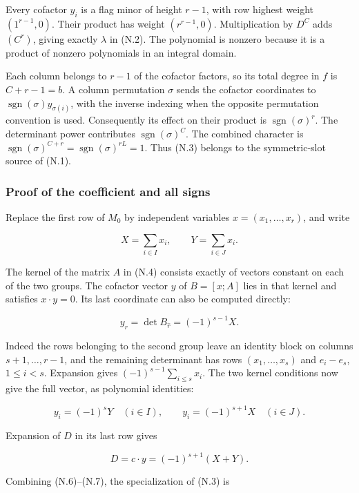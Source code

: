 \documentclass[
  10pt,
]{article}
\begin{document}
Every cofactor \(y_i\) is a flag minor of height \(r-1\), with row
highest weight \((1^{r-1},0)\). Their product has weight
\((r^{r-1},0)\). Multiplication by \(D^C\) adds \((C^r)\), giving
exactly \(\lambda\) in (N.2). The polynomial is nonzero because it is a
product of nonzero polynomials in an integral domain.

Each column belongs to \(r-1\) of the cofactor factors, so its total
degree in \(f\) is \(C+r-1=b\). A column permutation \(\sigma\) sends
the cofactor coordinates to \(\operatorname{sgn}(\sigma)y_{\sigma(i)}\),
with the inverse indexing when the opposite permutation convention is
used. Consequently its effect on their product is
\(\operatorname{sgn}(\sigma)^r\). The determinant power contributes
\(\operatorname{sgn}(\sigma)^C\). The combined character is
\(\operatorname{sgn}(\sigma)^{C+r}
=\operatorname{sgn}(\sigma)^{rL}=1\). Thus (N.3) belongs to the
symmetric-slot source of (N.1).

\subsubsection{Proof of the coefficient and all
signs}\label{proof-of-the-coefficient-and-all-signs}

Replace the first row of \(M_0\) by independent variables
\(x=(x_1,\ldots,x_r)\), and write

\[
X=\sum_{i\in I}x_i,\qquad Y=\sum_{i\in J}x_i.
\]

The kernel of the matrix \(A\) in (N.4) consists exactly of vectors
constant on each of the two groups. The cofactor vector \(y\) of
\(B=[x;A]\) lies in that kernel and satisfies \(x\cdot y=0\). Its last
coordinate can also be computed directly:

\[
y_r=\det B_{\widehat r}=(-1)^{s-1}X.
\]

Indeed the rows belonging to the second group leave an identity block on
columns \(s+1,\ldots,r-1\), and the remaining determinant has rows
\((x_1,\ldots,x_s)\) and \(e_i-e_s\), \(1\le i<s\). Expansion gives
\((-1)^{s-1}\sum_{i\le s}x_i\). The two kernel conditions now give the
full vector, as polynomial identities:

\[
y_i=(-1)^sY\quad(i\in I),\qquad
y_i=(-1)^{s+1}X\quad(i\in J).
\tag{N.6}
\]

Expansion of \(D\) in its last row gives

\[
D=c\cdot y=(-1)^{s+1}(X+Y).
\tag{N.7}
\]

Combining (N.6)--(N.7), the specialization of (N.3) is
\end{document}
